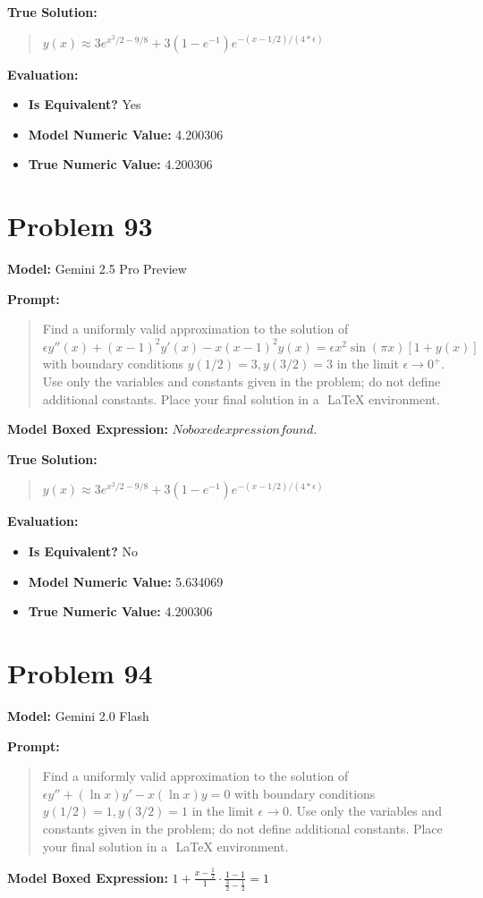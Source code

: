 \documentclass{article}
\begin{document}
{\textbf{True Solution:}
\begin{quote}
$y(x) \approx 3 e^{x^2/2 - 9/8} + 3(1 - e^{-1}) e^{-(x-1/2)/(4*\epsilon)}$
\end{quote}

\textbf{Evaluation:}
\begin{itemize}
\item \textbf{Is Equivalent?} Yes
\item \textbf{Model Numeric Value:} 4.200306
\item \textbf{True Numeric Value:} 4.200306
\end{itemize}
\vspace{1cm}
\section*{Problem 93}
\textbf{Model:} Gemini 2.5 Pro Preview

\textbf{Prompt:}
\begin{quote}
Find a uniformly valid approximation to the solution of $ \epsilon y''(x) + (x-1)^2 y'(x) - x(x-1)^2 y(x) = \epsilon x^2 \sin(\pi x) [1+y(x)] $ with boundary conditions $y(1/2)=3, y(3/2)=3$ in the limit $\epsilon \rightarrow 0^+$. Use only the variables and constants given in the problem; do not define additional constants. Place your final solution in a $\boxed{}$ LaTeX environment.
\end{quote}
\textbf{Model Boxed Expression:} $No boxed expression found.$

\textbf{True Solution:}
\begin{quote}
$y(x) \approx 3 e^{x^2/2 - 9/8} + 3(1 - e^{-1}) e^{-(x-1/2)/(4*\epsilon)}$
\end{quote}

\textbf{Evaluation:}
\begin{itemize}
\item \textbf{Is Equivalent?} No
\item \textbf{Model Numeric Value:} 5.634069
\item \textbf{True Numeric Value:} 4.200306
\end{itemize}
\vspace{1cm}
\section*{Problem 94}
\textbf{Model:} Gemini 2.0 Flash

\textbf{Prompt:}
\begin{quote}
Find a uniformly valid approximation to the solution of $\epsilon y'' + (\ln x)y' - x(\ln x)y = 0$ with boundary conditions $y(1/2) = 1, y(3/2) = 1$ in the limit $\epsilon \to 0$. Use only the variables and constants given in the problem; do not define additional constants. Place your final solution in a $\boxed{}$ LaTeX environment.
\end{quote}
\textbf{Model Boxed Expression:} $1 + \frac{x - \frac{1}{2}}{1} \cdot \frac{1 - 1}{\frac{3}{2} - \frac{1}{2}} = 1$

}
\end{document}
